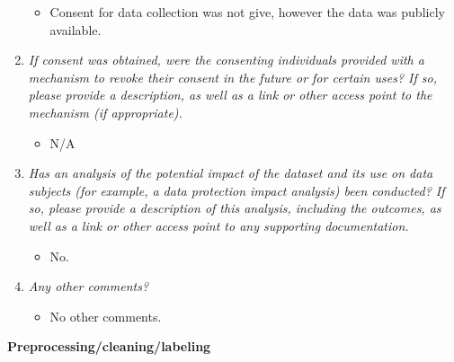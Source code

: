 \documentclass[
]{article}
\providecommand{\tightlist}{%
  \setlength{\itemsep}{0pt}\setlength{\parskip}{0pt}}
\begin{document}
\begin{enumerate}
  \begin{itemize}
  \tightlist
  \item
    Consent for data collection was not give, however the data was publicly available.
  \end{itemize}
\item
  \emph{If consent was obtained, were the consenting individuals provided with a mechanism to revoke their consent in the future or for certain uses? If so, please provide a description, as well as a link or other access point to the mechanism (if appropriate).}

  \begin{itemize}
  \tightlist
  \item
    N/A
  \end{itemize}
\item
  \emph{Has an analysis of the potential impact of the dataset and its use on data subjects (for example, a data protection impact analysis) been conducted? If so, please provide a description of this analysis, including the outcomes, as well as a link or other access point to any supporting documentation.}

  \begin{itemize}
  \tightlist
  \item
    No.
  \end{itemize}
\item
  \emph{Any other comments?}

  \begin{itemize}
  \tightlist
  \item
    No other comments.
  \end{itemize}
\end{enumerate}

\textbf{Preprocessing/cleaning/labeling}
\end{document}

